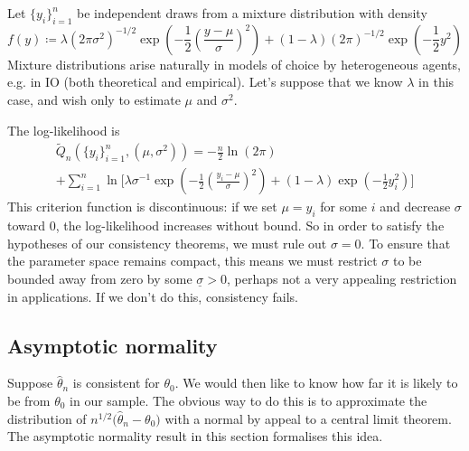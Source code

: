 \documentclass[11pt,letterpaper,reqno,oneside]{article}
\begin{document}
\begin{example}
	Let $\{ y_i \}_{i=1}^n$ be independent draws from a mixture distribution with density
	\begin{equation*}
		f(y) \coloneqq 
		\lambda \left(2\pi\sigma^2\right)^{-1/2}
		\exp\left( -\frac{1}{2} \left(\frac{y-\mu}{\sigma}\right)^2 \right)
		+
		(1-\lambda) \left(2\pi\right)^{-1/2}
		\exp\left( -\frac{1}{2} y^2 \right)
	\end{equation*}
	Mixture distributions arise naturally in models of choice by heterogeneous agents, e.g. in IO (both theoretical and empirical). Let's suppose that we know $\lambda$ in this case, and wish only to estimate $\mu$ and $\sigma^2$.

	The log-likelihood is
	\begin{multline*}
		\widetilde{Q}_n\left( \{ y_i \}_{i=1}^n, \left(\mu, \sigma^2\right) \right)
		= -\frac{n}{2} \ln( 2\pi )
		\\
		+ \sum_{i=1}^n \ln \Bigg[
		\lambda \sigma^{-1}
		\exp\left( -\frac{1}{2} \left(\frac{y_i-\mu}{\sigma}\right)^2 \right)
		+
		(1-\lambda) 
		\exp\left( -\frac{1}{2} y_i^2 \right)
		\Bigg]
	\end{multline*}
	This criterion function is discontinuous: if we set $\mu=y_i$ for some $i$ and decrease $\sigma$ toward 0, the log-likelihood increases without bound. So in order to satisfy the hypotheses of our consistency theorems, we must rule out $\sigma=0$. To ensure that the parameter space remains compact, this means we must restrict $\sigma$ to be bounded away from zero by some $\underline{\sigma}>0$, perhaps not a very appealing restriction in applications. If we don't do this, consistency fails.
\end{example}



\subsection{Asymptotic normality}
\label{sec:extremum:asymptotic_normality}

Suppose $\widehat{\theta}_n$ is consistent for $\theta_0$. We would then like to know how far it is likely to be from $\theta_0$ in our sample. The obvious way to do this is to approximate the distribution of $n^{1/2} \bigl( \widehat{\theta}_n - \theta_0 \bigr)$ with a normal by appeal to a central limit theorem. The asymptotic normality result in this section formalises this idea.
\end{document}
